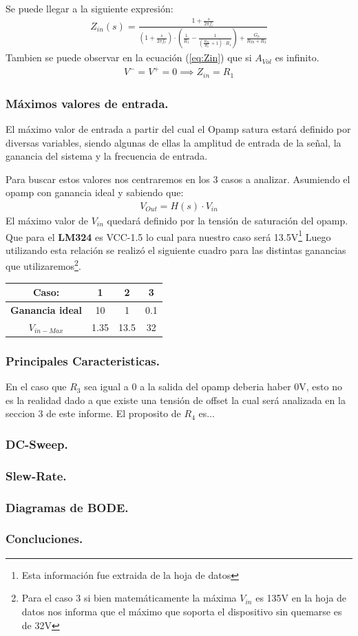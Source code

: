 Se puede llegar a la siguiente expresión:
\begin{align}
	Z_{in}(s)=\frac{1+\frac{s}{2\pi f_c}}{(1+\frac{s}{2\pi f_c}) \cdot \left( \frac{1}{R_1} - \frac{1}{(\frac{R_{Th}}{R_2}+1 ) \cdot R_1}\right) + \frac{G_0}{R_{Th}+R_2}}
\end{align}
Tambien se puede observar en la ecuación (\ref{eq:Zin}) que si $A_{Vol}$ es infinito.
\begin{align} V^- = V^+=0 \implies Z_{in}=R_1\end{align}
\subsubsection{Máximos valores de entrada.}
El máximo valor de entrada a partir del cual el Opamp satura estará definido por diversas variables, siendo algunas de ellas la amplitud de entrada de la señal, la ganancia del sistema y la frecuencia de entrada.

Para buscar estos valores nos centraremos en los 3 casos a analizar. 
Asumiendo el opamp con ganancia ideal y sabiendo que:
\begin{align} V_{Out}=H(s)\cdot V_{in}\end{align}
El máximo valor de $V_{in}$ quedará definido por la tensión de saturación del opamp. Que para el \textbf{LM324} es VCC-1.5 lo cual para nuestro caso será 13.5V\footnote{Esta información fue extraida de la hoja de datos}
Luego utilizando esta relación se realizó el siguiente cuadro para las distintas ganancias que utilizaremos\footnote{Para el caso 3 si bien matemáticamente la máxima $V_{in}$ es 135V en la hoja de datos nos informa que el máximo que soporta el dispositivo sin quemarse es de 32V }.
\begin{table}[H]
\begin{center}
\begin{tabular}{|c|c|c|c|}
\hline
\textbf{Caso:}        & \textbf{1} & \textbf{2} & \textbf{3} \\ \hline
\textbf{Ganancia ideal}     & 10         & 1          & 0.1        \\ \hline
\textbf{$V_{in-Max}$} & 1.35       & 13.5       & 32         \\ \hline
\end{tabular}
\end{center}
\end{table}
\subsubsection{Principales Caracteristicas.}
En el caso que $R_3$ sea igual a 0 a la salida del opamp deberia haber 0V, esto no es la realidad dado a que existe una tensión de offset la cual será analizada en la seccion 3 de este informe.
El proposito de $R_4$ es...
\subsubsection{DC-Sweep.}
\subsubsection{Slew-Rate.}
\subsubsection{Diagramas de BODE.}
\subsubsection{Concluciones.}
